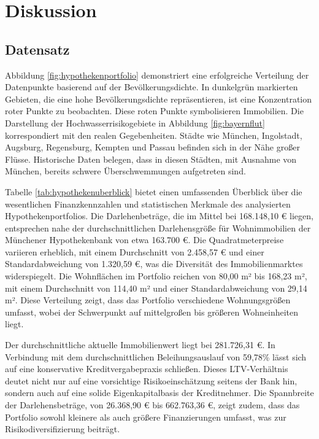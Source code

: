 
\section{Diskussion}\label{kap:6}
\subsection{Datensatz}

Abbildung \ref{fig:hypothekenportfolio} demonstriert eine erfolgreiche Verteilung der Datenpunkte basierend auf der Bevölkerungsdichte. In dunkelgrün markierten Gebieten, die eine hohe Bevölkerungsdichte repräsentieren, ist eine Konzentration roter Punkte zu beobachten. Diese roten Punkte symbolisieren Immobilien.
Die Darstellung der Hochwasserrisikogebiete in Abbildung \ref{fig:bayernflut} korrespondiert mit den realen Gegebenheiten. Städte wie München, Ingolstadt, Augsburg, Regensburg, Kempten und Passau befinden sich in der Nähe großer Flüsse. Historische Daten belegen, dass in diesen Städten, mit Ausnahme von München, bereits schwere Überschwemmungen aufgetreten sind.

Tabelle \ref{tab:hypothekenuberblick} bietet einen umfassenden Überblick über die wesentlichen Finanzkennzahlen und statistischen Merkmale des analysierten Hypothekenportfolios. Die Darlehenbeträge, die im Mittel bei 168.148,10 € liegen, entsprechen nahe der durchschnittlichen Darlehensgröße für Wohnimmobilien der Münchener Hypothekenbank von etwa 163.700 €. Die Quadratmeterpreise variieren erheblich, mit einem Durchschnitt von 2.458,57 € und einer Standardabweichung von 1.320,59 €, was die Diversität des Immobilienmarktes widerspiegelt. Die Wohnflächen im Portfolio reichen von 80,00 m² bis 168,23 m², mit einem Durchschnitt von 114,40 m² und einer Standardabweichung von 29,14 m². Diese Verteilung zeigt, dass das Portfolio verschiedene Wohnungsgrößen umfasst, wobei der Schwerpunkt auf mittelgroßen bis größeren Wohneinheiten liegt.

Der durchschnittliche aktuelle Immobilienwert liegt bei 281.726,31 €. In Verbindung mit dem durchschnittlichen Beleihungsauslauf von 59,78\% lässt sich auf eine konservative Kreditvergabepraxis schließen. Dieses LTV-Verhältnis deutet nicht nur auf eine vorsichtige Risikoeinschätzung seitens der Bank hin, sondern auch auf eine solide Eigenkapitalbasis der Kreditnehmer. Die Spannbreite der Darlehensbeträge, von 26.368,90 € bis 662.763,36 €, zeigt zudem, dass das Portfolio sowohl kleinere als auch größere Finanzierungen umfasst, was zur Risikodiversifizierung beiträgt.

